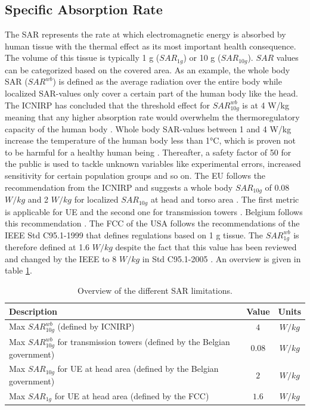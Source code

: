 \subsection{Specific Absorption Rate}
The \gls{SAR} represents the rate at which electromagnetic energy is 
absorbed by human tissue with the thermal effect as its most important health consequence.
The volume of this tissue is typically 1 g ($SAR_{1g}$) or 10 g ($SAR_{10g}$). 
$SAR$ values can be categorized based on the covered area. As an example, 
the whole body \gls{SAR} ($SAR^{wb}$) is defined as the average radiation over the entire body while
localized \gls{SAR}-values only cover a certain part of the human body like the head.
The \gls{ICNIRP} has concluded that the threshold effect for $SAR^{wb}_{10g}$ is at 4 W/kg meaning that any higher absorption 
rate would overwhelm the \gls{thermoregulatory capacity} of the human body \cite{J23,J24}.
Whole body \gls{SAR}-values between 1 and 4 W/kg increase the temperature of the human body less than 1°C, which is proven not to be harmful 
for a healthy human being \cite{J24,P2}.
Thereafter, a safety factor of 50 for the public \cite{J23} is used to tackle unknown variables like experimental errors, increased sensitivity for certain population groups and so on. 
The \gls{EU} follows the recommendation from the \gls{ICNIRP} \cite{J23} and 
suggests a whole body $SAR_{10g}$ of 0.08 $W/kg$ and 2 $W/kg$ for localized $SAR_{10g}$ at head and torso area \cite{J31_bioeffects,J30}. 
The first metric is applicable for \gls{UE} and the second one for transmission towers \cite{S20}.
Belgium follows this recommendation \cite{J23,S13_normenBelgie}.
The \gls{FCC} of the \gls{USA} follows the recommendations of the \gls{IEEE} Std C95.1-1999 \cite{P1,P2} that defines 
regulations based on 1 g tissue.
The $SAR^{wb}_{1g}$ is therefore defined at 1.6 $W/kg$ despite the fact that this value has been reviewed and changed by the \gls{IEEE} to 8 $W/kg$ in Std C95.1-2005 \cite{P2}.
An overview is given in table \ref{table:overviewSARValues}.

\begin{table}[h!]
\begin{tabular}{|l|c|c|}
\hline
\textbf{Description} & \textbf{Value} & \textbf{Units} \\ \hline
Max $SAR^{wb}_{10g}$ (defined by \gls{ICNIRP})                           &  $4$ & $W/kg$              \\ \hline
Max $SAR^{wb}_{10g}$ for transmission towers (defined by the Belgian government)                & $0.08$ & $W/kg$               \\ \hline
Max $SAR_{10g}$ for \acs{UE} at head area (defined by the Belgian government)                  & $2$ & $W/kg$               \\ \hline
Max $SAR_{1g}$ for \acs{UE} at head area (defined by the \gls{FCC})                  & $1.6$ & $W/kg$               \\ \hline
\end{tabular}
\caption{Overview of the different \acs{SAR} limitations.}
\label{table:overviewSARValues}
\end{table}

